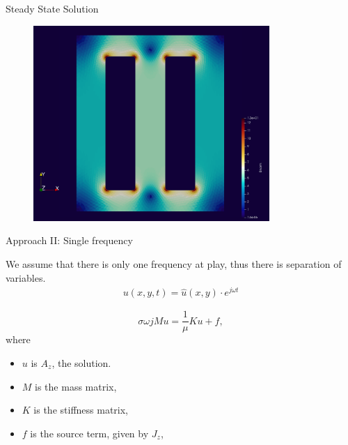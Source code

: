 \documentclass[aspectratio=43]{beamer}
\begin{document}
\begin{frame}[fragile]{Steady State Solution} %
\begin{figure}
    \centering
    \includegraphics[width=0.8\textwidth]{figures/steady_state_cropped.png}
    \label{fig:my_label}
\end{figure}
\end{frame}

\begin{frame}[fragile]{Approach II: Single frequency} %

We assume that there is only one frequency at play, thus there is separation of variables.
\begin{align*}
    u(x,y,t) = \hat u(x,y) \cdot e^{j\omega t}
\end{align*}

\begin{discretization}
    \begin{equation*}
        \sigma \omega j M u  = \frac{1}{\mu}K u + f,
    \end{equation*}
    where
    \begin{itemize}
        \item $u$ is $A_z$, the solution.
        \item $M$ is the mass matrix,
        \item $K$ is the stiffness matrix,
        \item $f$ is the source term, given by $J_z$,
    \end{itemize}
\end{discretization}
\end{frame}
\end{document}
